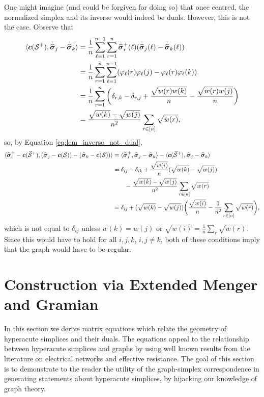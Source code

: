 One might imagine (and could be forgiven for doing so) that once centred, the normalized simplex and its inverse would indeed be duals. However, this is not the case. Observe that 
\begin{align*}
\langle \vb*{c}(\mathcal{S}^+),\widehat{\vb*{\sigma}}_j-\widehat{\vb*{\sigma}}_k\rangle &= \frac{1}{n}\sum_{\ell=1}^{n-1} \sum_{r=1}^n \widehat{\vb*{\sigma}}^+_r(\ell)(\widehat{\vb*{\sigma}}_j(\ell)-\widehat{\vb*{\sigma}}_k(\ell))  \\&= 
\frac{1}{n}\sum_{r=1}^n \sum_{\ell=1}^{n-1} (\varphi_\ell(r)\varphi_\ell(j) - \varphi_\ell(r)\varphi_\ell(k) ) \\
&= \frac{1}{n} \sum_{r=1}^n \bigg(\delta_{r,k} - \delta_{r,j} + \frac{\sqrt{w(r)w(k)}}{n} - \frac{\sqrt{w(r)w(j)}}{n}\bigg) \\
&= \frac{\sqrt{w(k)}-\sqrt{w(j)}}{n^2} \sum_{r\in[n]}\sqrt{w(r)},
\end{align*}
so, by Equation \eqref{eq:lem_inverse_not_dual},
\begin{align*}
\langle \widehat{\vb*{\sigma}}_i^+-\vb*{c}(\widehat{\mathcal{S}}^+),(\widehat{\vb*{\sigma}}_j-\vb*{c}(\mathcal{S})) - (\widehat{\vb*{\sigma}}_k-\vb*{c}(\mathcal{S}))\rangle &= \langle \widehat{\vb*{\sigma}}_i^+,\widehat{\vb*{\sigma}}_j-\widehat{\vb*{\sigma}}_k\rangle - \langle \vb*{c}(\widehat{\mathcal{S}}^+),\widehat{\vb*{\sigma}}_j-\widehat{\vb*{\sigma}}_k\rangle \\
&= \delta_{ij} - \delta_{ik} + \frac{\sqrt{w(i)}}{n}(\sqrt{w(k)} - \sqrt{w(j)})  \\
&\qquad - \frac{\sqrt{w(k)}-\sqrt{w(j)}}{n^2} \sum_{r\in[n]}\sqrt{w(r)} \\
&= \delta_{ij} + (\sqrt{w(k)}-\sqrt{w(j)})\bigg(\frac{\sqrt{w(i)}}{n} - \frac{1}{n^2}\sum_{r\in[n]}\sqrt{w(r)}\bigg),
\end{align*}
which is not equal to $\delta_{ij}$ unless $w(k)=w(j)$ or $\sqrt{w(i)}= \frac{1}{n}\sum_r \sqrt{w(r)}$. Since this would have to hold for all $i,j,k$, $i,j\neq k$, both of these conditions imply that the graph would have to be regular. 







\section{Construction via Extended Menger and Gramian}
In this section we derive matrix equations which relate the geometry of hyperacute simplices and their duals. The equations appeal to the relationship between hyperacute simplices and graphs by using well known results from the literature on electrical networks and effective resistance. The goal of this section is to demonstrate to the reader the utility of the graph-simplex correspondence in generating statements about hyperacute simplices, by hijacking our knowledge of graph theory. 


